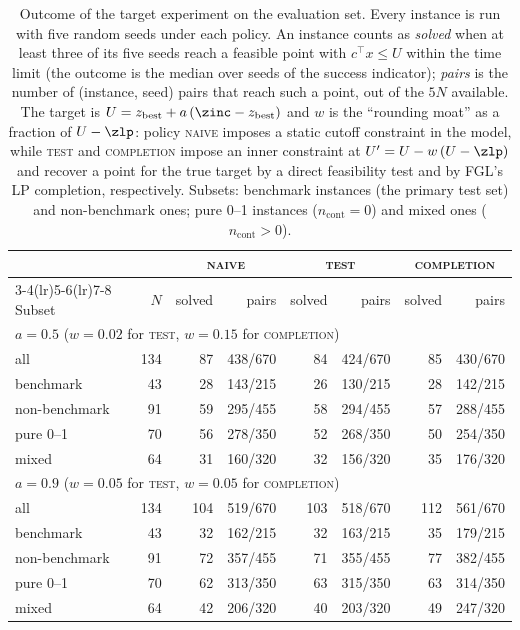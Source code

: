 \begin{table}[t]
\centering
\caption{Outcome of the target experiment on the evaluation set. Every instance is run
with five random seeds under each policy. An instance counts as \emph{solved} when at least
three of its five seeds reach a feasible point with $c^{\top}x \le U$ within the time limit
(the outcome is the median over seeds of the success indicator); \emph{pairs} is the number of
(instance, seed) pairs that reach such a point, out of the $5N$ available. The target is
$U = z_{\mathrm{best}} + a\,(\zinc - z_{\mathrm{best}})$ and $w$ is the ``rounding moat''
as a fraction of $U - \zlp$:
policy \textsc{naive} imposes a static cutoff constraint in the model, while \textsc{test} and \textsc{completion} impose an inner constraint at $U' = U - w\,(U - \zlp)$ and recover a point for the true target by a direct feasibility test and by FGL's LP completion, respectively. Subsets: benchmark instances (the primary test set) and non-benchmark ones; pure 0--1
instances ($n_{\mathrm{cont}}=0$) and mixed ones ($n_{\mathrm{cont}}>0$).}
\label{tab:target-outcome}
\small
\setlength{\tabcolsep}{4pt}
\begin{tabular}{lr rr rr rr}
\toprule
& & \multicolumn{2}{c}{\textsc{naive}} & \multicolumn{2}{c}{\textsc{test}} & \multicolumn{2}{c}{\textsc{completion}} \\
\cmidrule(lr){3-4}\cmidrule(lr){5-6}\cmidrule(lr){7-8}
Subset & $N$ & solved & pairs & solved & pairs & solved & pairs \\
\midrule
\multicolumn{8}{l}{$a=0.5$ \quad ($w=0.02$ for \textsc{test}, $w=0.15$ for \textsc{completion})} \\
\addlinespace[1pt]
\quad all & 134 & 87 & 438/670 & 84 & 424/670 & 85 & 430/670 \\
\quad benchmark & 43 & 28 & 143/215 & 26 & 130/215 & 28 & 142/215 \\
\quad non-benchmark & 91 & 59 & 295/455 & 58 & 294/455 & 57 & 288/455 \\
\quad pure 0--1 & 70 & 56 & 278/350 & 52 & 268/350 & 50 & 254/350 \\
\quad mixed & 64 & 31 & 160/320 & 32 & 156/320 & 35 & 176/320 \\
\midrule
\multicolumn{8}{l}{$a=0.9$ \quad ($w=0.05$ for \textsc{test}, $w=0.05$ for \textsc{completion})} \\
\addlinespace[1pt]
\quad all & 134 & 104 & 519/670 & 103 & 518/670 & 112 & 561/670 \\
\quad benchmark & 43 & 32 & 162/215 & 32 & 163/215 & 35 & 179/215 \\
\quad non-benchmark & 91 & 72 & 357/455 & 71 & 355/455 & 77 & 382/455 \\
\quad pure 0--1 & 70 & 62 & 313/350 & 63 & 315/350 & 63 & 314/350 \\
\quad mixed & 64 & 42 & 206/320 & 40 & 203/320 & 49 & 247/320 \\
\bottomrule
\end{tabular}
\end{table}
